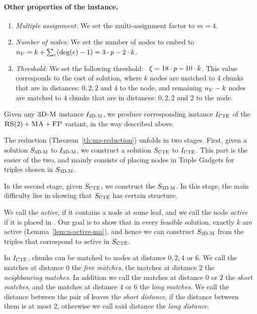 \paragraph{Other properties of the instance.}
\begin{enumerate}
  \item \emph{Multiple assignment:} We set the multi-assignment factor to $m=4$.
  \item \emph{Number of nodes:} We set the number of nodes to embed to
 ~$n_V = k + \sum_{e}(\deg(e)-1) = 3\cdot p - 2\cdot k$.
 \item \emph{Threshold:} We set the following threshold:
 ~$\xi = 18\cdot p - 10\cdot k$.
 This value corresponds to the cost of solution, where $k$ nodes are matched to $4$ chunks that are in distances: $0, 2, 2$ and $4$ to the node, and remaining $n_V-k$ nodes are matched to $4$ chunks that are in distances: $0, 2, 2$ and $2$ to the node.
\end{enumerate}

Given any $\textsc{3D-M}$ instance $I_{\mathrm{\textsc{3D-M}}}$, we produce corresponding instance $I_{\mathrm{\textsc{CTE}}}$ of the $\textsc{RS}(2)+\textsc{MA}+\textsc{FP}$ variant, in the way described above.

The reduction (Theorem~\ref{th:ma-reduction}) unfolds in two stages.
First, given a solution $S_{\mathrm{\textsc{3D-M}}}$ to $I_{\mathrm{\textsc{3D-M}}}$, we construct a solution $S_{\mathrm{\textsc{CTE}}}$ to $I_{\mathrm{\textsc{CTE}}}$.
This part is the easier of the two, and mainly consists of placing nodes in Triple Gadgets for triples chosen in $S_{\mathrm{\textsc{3D-M}}}$.

In the second stage, given $S_{\mathrm{\textsc{CTE}}}$, we construct the $S_{\mathrm{\textsc{3D-M}}}$.
In this stage, the main difficulty lies in showing that $S_{\mathrm{\textsc{CTE}}}$ has certain structure.

We call the {\TripleGadget} \textit{active}, if it contains a node at some leaf, and we call the node \textit{active} if it is placed in {\TripleGadget}.
Our goal is to show that in every feasible solution, exactly $k$ \TripleGadgets{} are active (Lemma~\ref{lem:n-active-ma}), and hence we can construct $S_{\mathrm{\textsc{3D-M}}}$ from the triples that correspond to active \TripleGadgets{} in $S_{\mathrm{\textsc{CTE}}}$.

In $I_{\mathrm{\textsc{CTE}}}$, chunks can be matched to nodes at distance $0, 2, 4$ or $6$.
  We call the matches at distance $0$ the \emph{free matches}, the matches at distance $2$ the \emph{neighbouring matches}.
  In addition we call the matches at distance $0$ or $2$ the \emph{short matches}, and the matches at distance $4$ or $6$ the \emph{long matches}.
  We call the distance between the pair of leaves the \emph{short distance}, if the distance between them is at most $2$, otherwise we call said distance the \emph{long distance}.

